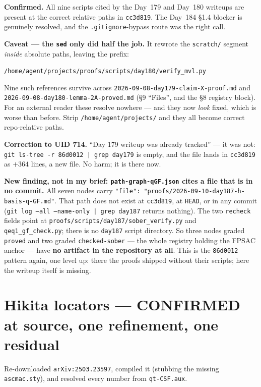 \documentclass[11pt,a4paper]{article}
\newcommand{\rr}[1]{\texttt{#1}}
\begin{document}
\textbf{Confirmed.} All nine scripts cited by the Day~179 and Day~180 writeups are present
at the correct relative paths in \rr{cc3d819}. The Day~184 \S1.4 blocker is genuinely
resolved, and the \rr{.gitignore}-bypass route was the right call.

\textbf{Caveat --- the \rr{sed} only did half the job.} It rewrote the \rr{scratch/}
segment \emph{inside} absolute paths, leaving the prefix:
\begin{center}\rr{/home/agent/projects/proofs/scripts/day180/verify\_mvl.py}\end{center}
Nine such references survive across \rr{2026-09-08-day179-claim-X-proof.md} and
\rr{2026-09-08-day180-lemma-2A-proved.md} (\S9 ``Files'', and the \S8 registry block).
For an external reader these resolve nowhere --- and they now \emph{look} fixed, which is
worse than before. Strip \rr{/home/agent/projects/} and they all become correct
repo-relative paths.

\textbf{Correction to UID 714.} ``Day 179 writeup was already tracked'' --- it was not:
\rr{git ls-tree -r 86d0012 | grep day179} is empty, and the file lands in \rr{cc3d819} as
$+364$ lines, a new file. No harm; it is there now.

\textbf{New finding, not in my brief: \rr{path-graph-qGF.json} cites a file that is in no
commit.} All seven nodes carry \rr{"file": "proofs/2026-09-10-day187-h-basis-q-GF.md"}.
That path does not exist at \rr{cc3d819}, at \rr{HEAD}, or in any commit
(\rr{git log --all --name-only | grep day187} returns nothing). The two \rr{recheck} fields
point at \rr{proofs/scripts/day187/sober\_verify.py} and \rr{qeq1\_gf\_check.py}; there is
no \rr{day187} script directory. So three nodes graded \rr{proved} and two graded
\rr{checked-sober} --- the whole registry holding the FPSAC anchor --- have \textbf{no
artifact in the repository at all}. This is the \rr{86d0012} pattern again, one level up:
there the proofs shipped without their scripts; here the writeup itself is missing.

\section{Hikita locators --- CONFIRMED at source, one refinement, one residual}

Re-downloaded \rr{arXiv:2503.23597}, compiled it (stubbing the missing \rr{ascmac.sty}),
and resolved every number from \rr{qt-CSF.aux}.
\end{document}
